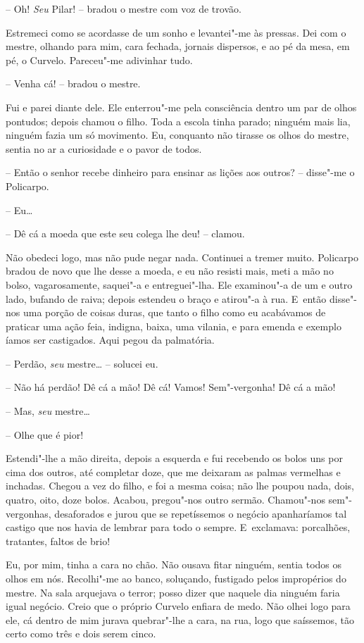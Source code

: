-- Oh! \emph{Seu} Pilar! -- bradou o mestre com voz de trovão.

Estremeci como se acordasse de um sonho e levantei"-me às pressas. Dei
com o mestre, olhando para mim, cara fechada, jornais dispersos, e ao pé
da mesa, em pé, o Curvelo. Pareceu"-me adivinhar tudo.

-- Venha cá! -- bradou o mestre.

Fui e parei diante dele. Ele enterrou"-me pela consciência dentro um par
de olhos pontudos; depois chamou o filho. Toda a escola tinha parado;
ninguém mais lia, ninguém fazia um só movimento. Eu, conquanto não
tirasse os olhos do mestre, sentia no ar a curiosidade e o pavor de
todos.

-- Então o senhor recebe dinheiro para ensinar as lições aos outros? --
disse"-me o Policarpo.

-- Eu\ldots{}

-- Dê cá a moeda que este seu colega lhe deu! -- clamou.

Não obedeci logo, mas não pude negar nada. Continuei a tremer muito.
Policarpo bradou de novo que lhe desse a moeda, e eu não resisti mais,
meti a mão no bolso, vagarosamente, saquei"-a e entreguei"-lha. Ele
examinou"-a de um e outro lado, bufando de raiva; depois estendeu o braço
e atirou"-a à rua. E~então disse"-nos uma porção de coisas duras, que
tanto o filho como eu acabávamos de praticar uma ação feia, indigna,
baixa, uma vilania, e para emenda e exemplo íamos ser castigados. Aqui
pegou da palmatória.

-- Perdão, \emph{seu} mestre\ldots{} -- solucei eu.

-- Não há perdão! Dê cá a mão! Dê cá! Vamos! Sem"-vergonha! Dê cá a mão!

-- Mas, \emph{seu} mestre\ldots{}

-- Olhe que é pior!

Estendi"-lhe a mão direita, depois a esquerda e fui recebendo os bolos
uns por cima dos outros, até completar doze, que me deixaram as palmas
vermelhas e inchadas. Chegou a vez do filho, e foi a mesma coisa; não
lhe poupou nada, dois, quatro, oito, doze bolos. Acabou, pregou"-nos
outro sermão. Chamou"-nos sem"-vergonhas, desaforados e jurou que se
repetíssemos o negócio apanharíamos tal castigo que nos havia de lembrar
para todo o sempre. E~exclamava: porcalhões, tratantes, faltos de brio!

Eu, por mim, tinha a cara no chão. Não ousava fitar ninguém, sentia
todos os olhos em nós. Recolhi"-me ao banco, soluçando, fustigado pelos
impropérios do mestre. Na sala arquejava o terror; posso dizer que
naquele dia ninguém faria igual negócio. Creio que o próprio Curvelo
enfiara de medo. Não olhei logo para ele, cá dentro de mim jurava
quebrar"-lhe a cara, na rua, logo que saíssemos, tão certo como três e
dois serem cinco.

